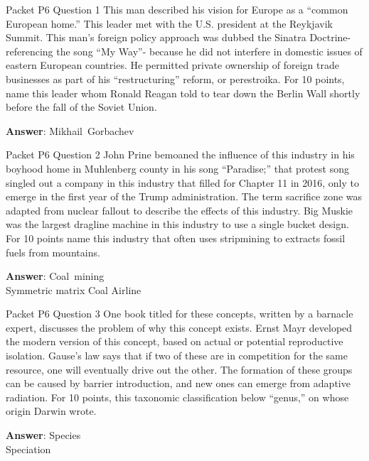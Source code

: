 \begin{frame}{Packet P6 Question 1}
This man described his vision for Europe as a “common European home.” This leader met with the U.S. president at the Reykjavik Summit. This man's foreign policy approach was dubbed the Sinatra Doctrine- referencing the song “My Way”- because he did not interfere in domestic issues of eastern European countries. He permitted private ownership of foreign trade businesses as part of his ``restructuring'' reform, or perestroika. For 10 points,     name this leader whom Ronald Reagan told   to tear down the Berlin Wall shortly before   the fall of the Soviet Union.

\textbf{Answer}: Mikhail\ Gorbachev\\
\end{frame}

\begin{frame}{Packet P6 Question 2}
John   Prine bemoaned the influence of this industry in his boyhood home in Muhlenberg county in his song “Paradise;” that protest song singled out a company in this industry that filled for Chapter 11 in 2016, only to emerge in the first year of the Trump administration.   The term sacrifice zone was adapted from nuclear fallout to describe the effects of this industry. Big Muskie was the largest dragline machine in this industry to use a single bucket design. For 10 points name this industry that often uses stripmining to extracts fossil fuels from mountains.    

\textbf{Answer}: Coal\ mining\\
 Symmetric matrix
 Coal
 Airline
\end{frame}

\begin{frame}{Packet P6 Question 3}
One book titled for these concepts, written by a barnacle expert, discusses the problem of why this concept exists. Ernst Mayr developed the modern version of this concept, based on actual or potential reproductive isolation.   Gause's law says that if two of these are in competition for the same resource, one will eventually drive out the other. The formation of these groups can be caused by barrier introduction, and new ones can emerge from adaptive radiation. For 10 points, this   taxonomic classification below ``genus,'' on whose origin Darwin       wrote.

\textbf{Answer}: Species\\
 Speciation
\end{frame}

